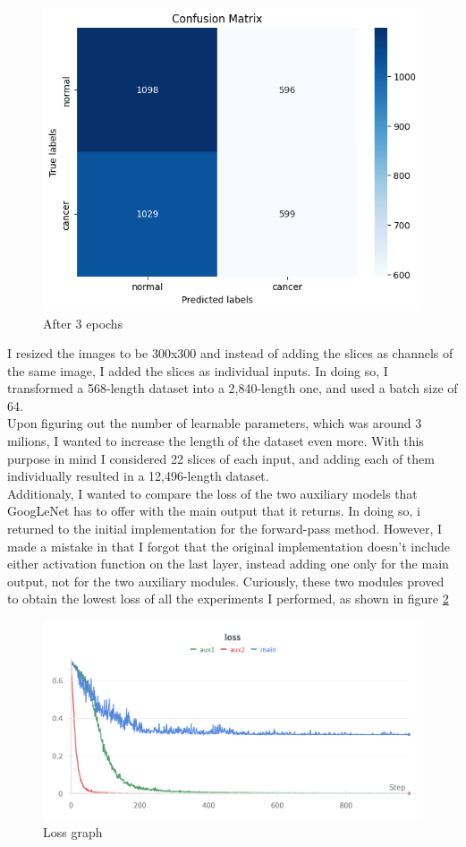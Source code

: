 \begin{figure}[!ht]
    \centering
    \includegraphics[width=0.5\linewidth]{figures/Figure18.png}
    \caption{After 3 epochs}
    \label{fig:fig17}
\end{figure}
I resized the images to be 300x300 and instead of adding the slices as channels of the same image, I added the slices as individual inputs. In doing so, I transformed a 568-length dataset into a 2,840-length one, and used a batch size of 64.\\
Upon figuring out the number of learnable parameters, which was around 3 milions, I wanted to increase the length of the dataset even more. With this purpose in mind I considered 22 slices of each input, and adding each of them individually resulted in a 12,496-length dataset.\\
Additionaly, I wanted to compare the loss of the two auxiliary models that GoogLeNet has to offer with the main output that it returns. In doing so, i returned to the initial implementation for the forward-pass method. However, I made a mistake in that I forgot that the original implementation doesn't include either activation function on the last layer, instead adding one only for the main output, not for the two auxiliary modules. Curiously, these two modules proved to obtain the lowest loss of all the experiments I performed, as shown in figure \ref{fig:fig18}\\
\begin{figure}[!ht]
    \centering
    \includegraphics[width=1\linewidth]{figures/Figure19.png}
    \caption{Loss graph}
    \label{fig:fig18}
\end{figure}
